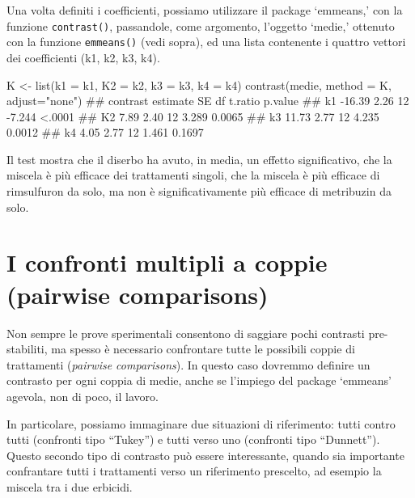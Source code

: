 \documentclass[a4paper,12pt,oneside]{book}
\newenvironment{Shaded}{\begin{snugshade}}{\end{snugshade}}
\newcommand{\StringTok}[1]{#1}
\newcommand{\DocumentationTok}[1]{#1}
\newcommand{\OtherTok}[1]{#1}
\newcommand{\FunctionTok}[1]{#1}
\newcommand{\AttributeTok}[1]{#1}
\newcommand{\NormalTok}[1]{#1}
\begin{document}
Una volta definiti i coefficienti, possiamo utilizzare il package `emmeans,' con la funzione \texttt{contrast()}, passandole, come argomento, l'oggetto `medie,' ottenuto con la funzione \texttt{emmeans()} (vedi sopra), ed una lista contenente i quattro vettori dei coefficienti (k1, k2, k3, k4).

\small

\begin{Shaded}
\begin{Highlighting}[]
\NormalTok{K }\OtherTok{\textless{}{-}} \FunctionTok{list}\NormalTok{(}\AttributeTok{k1 =}\NormalTok{ k1, }\AttributeTok{K2 =}\NormalTok{ k2, }\AttributeTok{k3 =}\NormalTok{ k3, }\AttributeTok{k4 =}\NormalTok{ k4)}
\FunctionTok{contrast}\NormalTok{(medie, }\AttributeTok{method =}\NormalTok{ K, }\AttributeTok{adjust=}\StringTok{"none"}\NormalTok{)}
\DocumentationTok{\#\#  contrast estimate   SE df t.ratio p.value}
\DocumentationTok{\#\#  k1         {-}16.39 2.26 12  {-}7.244  \textless{}.0001}
\DocumentationTok{\#\#  K2           7.89 2.40 12   3.289  0.0065}
\DocumentationTok{\#\#  k3          11.73 2.77 12   4.235  0.0012}
\DocumentationTok{\#\#  k4           4.05 2.77 12   1.461  0.1697}
\end{Highlighting}
\end{Shaded}

\normalsize

Il test mostra che il diserbo ha avuto, in media, un effetto significativo, che la miscela è più efficace dei trattamenti singoli, che la miscela è più efficace di rimsulfuron da solo, ma non è significativamente più efficace di metribuzin da solo.

\hypertarget{i-confronti-multipli-a-coppie-pairwise-comparisons}{%
\section{I confronti multipli a coppie (pairwise comparisons)}\label{i-confronti-multipli-a-coppie-pairwise-comparisons}}

Non sempre le prove sperimentali consentono di saggiare pochi contrasti pre-stabiliti, ma spesso è necessario confrontare tutte le possibili coppie di trattamenti (\emph{pairwise comparisons}). In questo caso dovremmo definire un contrasto per ogni coppia di medie, anche se l'impiego del package `emmeans' agevola, non di poco, il lavoro.

In particolare, possiamo immaginare due situazioni di riferimento: tutti contro tutti (confronti tipo ``Tukey'') e tutti verso uno (confronti tipo ``Dunnett''). Questo secondo tipo di contrasto può essere interessante, quando sia importante confrantare tutti i trattamenti verso un riferimento prescelto, ad esempio la miscela tra i due erbicidi.
\end{document}
